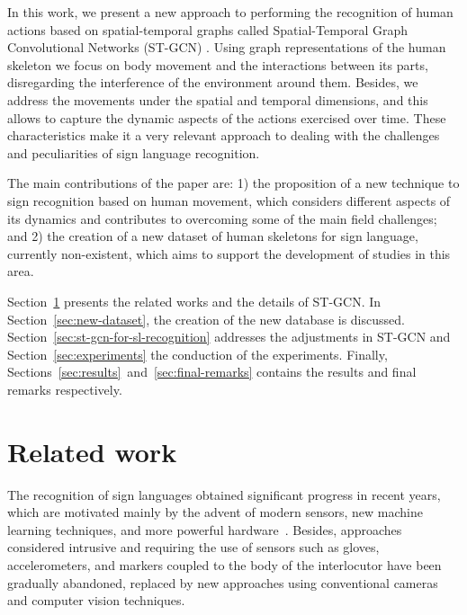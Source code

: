 In this work, we present a new approach to performing the recognition of human actions based on spatial-temporal graphs called Spatial-Temporal Graph Convolutional Networks (ST-GCN) \cite {st-gcn-2018}. Using graph representations of the human skeleton we focus on body movement and the interactions between its parts, disregarding the interference of the environment around them. Besides, we address the movements under the spatial and temporal dimensions, and this allows to capture the dynamic aspects of the actions exercised over time. These characteristics make it a very relevant approach to dealing with the challenges and peculiarities of sign language recognition.
 

The main contributions of the paper are: 1) the proposition of a new technique to sign recognition based on human movement, which considers different aspects of its dynamics and contributes to overcoming some of the main field challenges; and 2) the creation of a new dataset of human skeletons for sign language, currently non-existent, which aims to support the development of studies in this area.

Section~\ref{sec:related-work} presents the related works and the details of ST-GCN. In Section~\ref{sec:new-dataset},  the creation of the new database is discussed.
Section~\ref{sec:st-gcn-for-sl-recognition} addresses the adjustments in ST-GCN and Section~\ref{sec:experiments} the conduction of the experiments. Finally, Sections~\ref{sec:results}~and~\ref{sec:final-remarks} contains the results and final remarks respectively.

\section{Related work}
\label{sec:related-work}

The recognition of sign languages obtained significant progress in recent years, which are motivated mainly by the advent of modern sensors, new machine learning techniques, and more powerful hardware~\cite{recent-advances-dl-2017,recent-advances-sl-2013}. Besides, approaches considered intrusive and requiring the use of sensors such as gloves, accelerometers, and markers coupled to the body of the interlocutor have been gradually abandoned, replaced by new approaches using conventional cameras and computer vision techniques.


